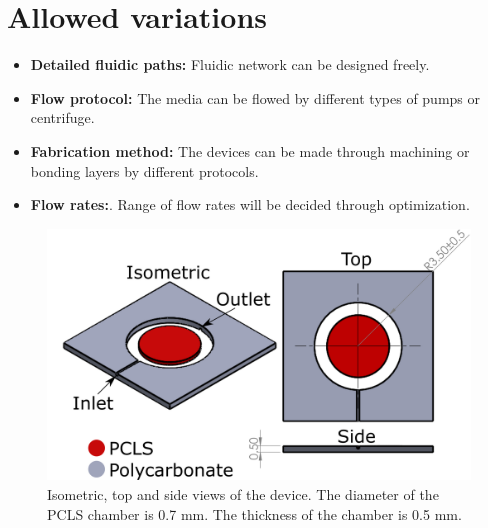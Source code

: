 \documentclass{EU-report}
\begin{document}
\section{Allowed variations}
\begin{itemize}
\item \textbf{Detailed fluidic paths:} Fluidic network can be designed freely.
\item \textbf{Flow protocol:} The media can be flowed by different types of
pumps or centrifuge.
\item \textbf{Fabrication method:} The devices can be made through machining or
bonding layers by different protocols.
\item \textbf{Flow rates:}. Range of flow rates will be decided through
optimization.
\end{itemize}

\begin{figure}
\centering

\includegraphics[width=.8\linewidth,keepaspectratio=true]{./device/tisumr-device.png}
\caption{Isometric, top and side views of the device. The diameter of the PCLS
chamber is 0.7 mm. The thickness of the chamber is 0.5 mm.}
\label{fig:tisumr-device}
\end{figure}
\end{document}

